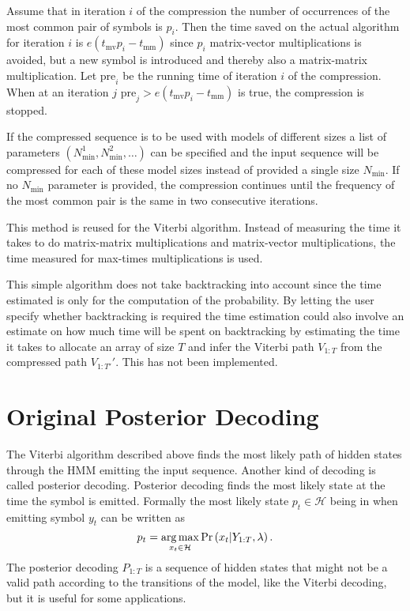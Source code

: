 Assume that in iteration $i$ of the compression the number of occurrences
of the most common pair of symbols is $p_i$. Then the time saved on the actual
algorithm for iteration $i$ is $e (t_{\text{mv}} p_i - t_{\text{mm}})$ since
$p_i$ matrix-vector multiplications is avoided, but a new symbol is introduced
and thereby also a matrix-matrix multiplication. Let $\text{pre}_i$ be the running
time of iteration $i$ of the compression. When at an iteration $j$
$\text{pre}_j > e (t_{\text{mv}} p_i - t_{\text{mm}})$ is true, the compression is
stopped.

If the compressed sequence is to be used with models of different sizes a list
of parameters $(N_{\text{min}}^1,N_{\text{min}}^2,\dots)$ can be specified and
the input sequence will be compressed for each of these model sizes instead of
provided a single size $N_{\text{min}}$. If no $N_{\text{min}}$ parameter is
provided, the compression continues until the frequency of the most common pair
is the same in two consecutive iterations.

This method is reused for the Viterbi algorithm. Instead of measuring the
time it takes to do matrix-matrix multiplications and matrix-vector
multiplications, the time measured for max-times multiplications is used.

This simple algorithm does not take backtracking into account since the time
estimated is only for the computation of the probability. By letting the user
specify whether backtracking is required the time estimation could also
involve an estimate on how much time will be spent on backtracking by
estimating the time it takes to allocate an array of size $T$ and
infer the Viterbi path $V_{1:T}$ from the compressed path $V_{1:T'}'$. This has
not been implemented.

\section{Original Posterior Decoding}
\label{sec:posterior-decoding-1}

The Viterbi algorithm described above finds the most likely path of hidden
states through the HMM emitting the input sequence. Another kind of decoding is
called posterior decoding. Posterior decoding finds the most likely state at
the time the symbol is emitted. Formally the most likely state
$p_t \in \mathcal{H}$ being in when emitting symbol $y_t$ can be written as
\begin{equation*}
  p_t = \operatorname*{arg\,max}_{x_t \in \mathcal{H}} \Pr \left(x_t | Y_{1:T}, \lambda \right).
\end{equation*}
The posterior decoding $P_{1:T}$ is a sequence of hidden states that might not
be a valid path according to the transitions of the model, like the Viterbi
decoding, but it is useful for some applications.

